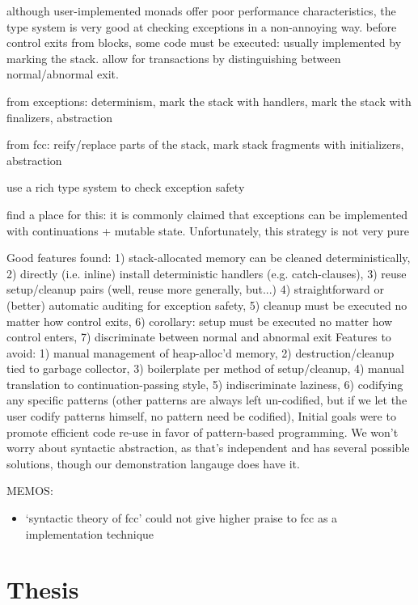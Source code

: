 \documentclass[11pt]{article}
\newcommand{\maybePage}{\newpage}
\begin{document}
although user-implemented monads offer poor performance characteristics, the type system is very good at checking exceptions in a non-annoying way.
before control exits from blocks, some code must be executed: usually implemented by marking the stack.
allow for transactions by distinguishing between normal/abnormal exit.



from exceptions: determinism, mark the stack with handlers, mark the stack with finalizers, abstraction

from fcc: reify/replace parts of the stack, mark stack fragments with initializers, abstraction

use a rich type system to check exception safety

find a place for this: it is commonly claimed that exceptions can be implemented with continuations + mutable state. Unfortunately, this strategy is not very pure


Good features found:
  1) stack-allocated memory can be cleaned deterministically,
  2) directly (i.e. inline) install deterministic handlers (e.g. catch-clauses),
  3) reuse setup/cleanup pairs (well, reuse more generally, but...)
  4) straightforward or (better) automatic auditing for exception safety,
  5) cleanup must be executed no matter how control exits,
  6) corollary: setup must be executed no matter how control enters,
  7) discriminate between normal and abnormal exit
Features to avoid:
  1) manual management of heap-alloc'd memory,
  2) destruction/cleanup tied to garbage collector,
  3) boilerplate per method of setup/cleanup,
  4) manual translation to continuation-passing style,
  5) indiscriminate laziness,
  6) codifying any specific patterns (other patterns are always left un-codified, but if we let the user codify patterns himself, no pattern need be codified),
Initial goals were to promote efficient code re-use in favor of pattern-based programming.
We won't worry about syntactic abstraction, as that's independent and has several possible solutions, though our demonstration langauge does have it.


MEMOS:
\begin{itemize}
\item `syntactic theory of fcc' could not give higher praise to fcc as a implementation technique
\end{itemize}



\maybePage
\part{Thesis}
\end{document}

